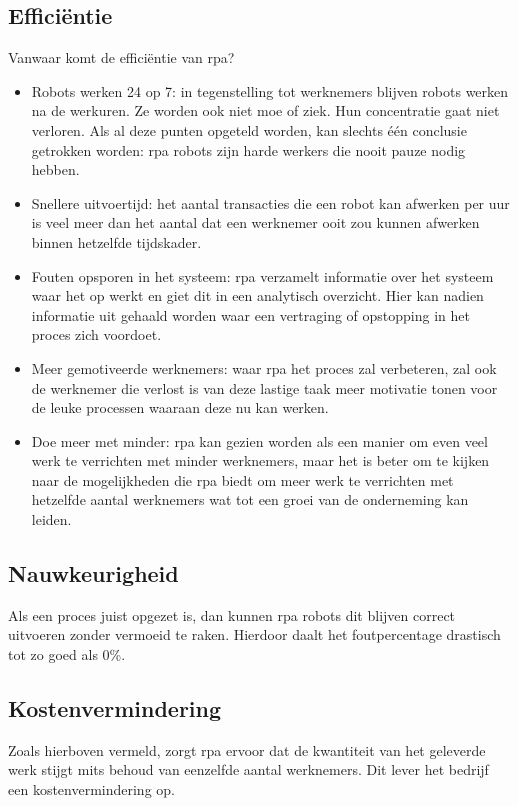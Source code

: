 \subsection{Efficiëntie}
Vanwaar komt de efficiëntie van \acrshort{rpa}?
\begin{itemize}
	\item Robots werken 24 op 7: in tegenstelling tot werknemers blijven robots werken na de werkuren. Ze worden ook niet moe of ziek. Hun concentratie gaat niet verloren. Als al deze punten opgeteld worden, kan slechts één conclusie getrokken worden: \acrshort{rpa} robots zijn harde werkers die nooit pauze nodig hebben.
	\item Snellere uitvoertijd: het aantal transacties die een robot kan afwerken per uur is veel meer dan het aantal dat een werknemer ooit zou kunnen afwerken binnen hetzelfde tijdskader.
	\item Fouten opsporen in het systeem: \acrshort{rpa} verzamelt informatie over het systeem waar het op werkt en giet dit in een analytisch overzicht. Hier kan nadien informatie uit gehaald worden waar een vertraging of opstopping in het proces zich voordoet.
	\item Meer gemotiveerde werknemers: waar \acrshort{rpa} het proces zal verbeteren, zal ook de werknemer die verlost is van deze lastige taak meer motivatie tonen voor de leuke processen waaraan deze nu kan werken.
	\item Doe meer met minder: \acrshort{rpa} kan gezien worden als een manier om even veel werk te verrichten met minder werknemers, maar het is beter om te kijken naar de mogelijkheden die \acrshort{rpa} biedt om meer werk te verrichten met hetzelfde aantal werknemers wat tot een groei van de onderneming kan leiden.
\end{itemize}

\autocite{efficiencyRPA}
\subsection{Nauwkeurigheid}
Als een proces juist opgezet is, dan kunnen \acrshort{rpa} robots dit blijven correct uitvoeren zonder vermoeid te raken. Hierdoor daalt het foutpercentage drastisch tot zo goed als 0\%. \autocite{efficiencyRPA}

\subsection{Kostenvermindering}
Zoals hierboven vermeld, zorgt \acrshort{rpa} ervoor dat de kwantiteit van het geleverde werk stijgt mits behoud van eenzelfde aantal werknemers. Dit lever het bedrijf een kostenvermindering op. \autocite{efficiencyRPA}


